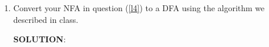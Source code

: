 \documentclass[12pt]{article}
\newcommand{\sol}{\par{\bf SOLUTION}: }
\begin{document}
\begin{enumerate}
\sol %


\item Convert your NFA in question (\ref{l4}) to a DFA using the algorithm we described in class.

\sol %






\end{enumerate}
\end{document}
